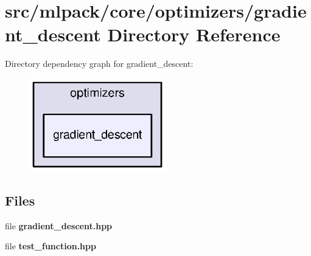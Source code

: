 \section{src/mlpack/core/optimizers/gradient\+\_\+descent Directory Reference}
\label{dir_6aa760fe348f674b356bdba40d95b29b}
Directory dependency graph for gradient\+\_\+descent\+:
\nopagebreak
\begin{figure}[H]
\begin{center}
\leavevmode
\includegraphics[width=168pt]{dir_6aa760fe348f674b356bdba40d95b29b_dep}
\end{center}
\end{figure}
\subsection*{Files}
\begin{DoxyCompactItemize}
\item 
file {\bf gradient\+\_\+descent.\+hpp}
\item 
file {\bf test\+\_\+function.\+hpp}
\end{DoxyCompactItemize}

